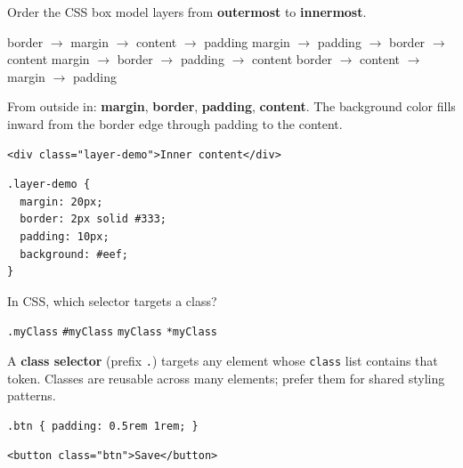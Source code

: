 \question[4]
Order the CSS box model layers from \textbf{outermost} to \textbf{innermost}.
\begin{choices}
  \choice border $\rightarrow$ margin $\rightarrow$ content $\rightarrow$ padding
  \choice margin $\rightarrow$ padding $\rightarrow$ border $\rightarrow$ content
  \CorrectChoice margin $\rightarrow$ border $\rightarrow$ padding $\rightarrow$ content
  \choice border $\rightarrow$ content $\rightarrow$ margin $\rightarrow$ padding
\end{choices}
\begin{solution}
  From outside in: \textbf{margin}, \textbf{border}, \textbf{padding}, \textbf{content}. The background color fills inward from the border edge through padding to the content.
\begin{lstlisting}[style=htmlinline]
<div class="layer-demo">Inner content</div>
\end{lstlisting}
\begin{lstlisting}[style=cssinline]
.layer-demo {
  margin: 20px;
  border: 2px solid #333;
  padding: 10px;
  background: #eef;
}
\end{lstlisting}
\end{solution}

\question[4]
In CSS, which selector targets a class?
\begin{choices}
  \CorrectChoice \texttt{.myClass}
  \choice \texttt{\#myClass}
  \choice \texttt{myClass}
  \choice \texttt{*myClass}
\end{choices}
\begin{solution}
  A \textbf{class selector} (prefix \texttt{.}) targets any element whose \texttt{class} list contains that token. Classes are reusable across many elements; prefer them for shared styling patterns.
\begin{lstlisting}[style=cssinline]
.btn { padding: 0.5rem 1rem; }
\end{lstlisting}
\begin{lstlisting}[style=htmlinline]
<button class="btn">Save</button>
\end{lstlisting}
\end{solution}

